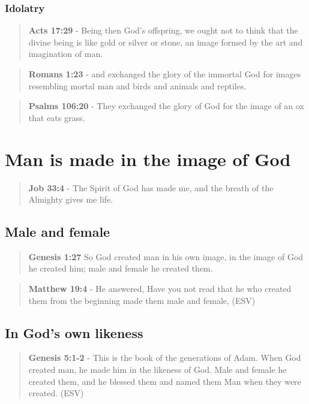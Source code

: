 \documentclass[11pt]{article}
\begin{document}
\subsubsection{Idolatry}
\label{sec:org038acb3}

\begin{quote}
\textbf{Acts 17:29} - Being then God's offspring, we ought not to think that the divine being is like gold or silver or stone, an image formed by the art and imagination of man.
\end{quote}

\begin{quote}
\textbf{Romans 1:23} - and exchanged the glory of the immortal God for images resembling mortal man and birds and animals and reptiles.􄐺
\end{quote}

\begin{quote}
\textbf{Psalms 106:20} - They exchanged the glory of God for the image of an ox that eats grass.􂉢
\end{quote}

\section{Man is made in the image of God}
\label{sec:org3102bcc}
\begin{quote}
\textbf{Job 33:4} - The Spirit of God has made me, and the breath of the Almighty gives me life.
\end{quote}

\subsection{Male and female}
\label{sec:org703a29a}
\begin{quote}
\textbf{Genesis 1:27} So God created man in his own image, in the image of God he created him; male and female he created them.
\end{quote}

\begin{quote}
\textbf{Matthew 19:4} - He answered, Have you not read that he who created them from the beginning made them male and female, (ESV)
\end{quote}

\subsection{In God's own likeness}
\label{sec:org78dd30a}
\begin{quote}
\textbf{Genesis 5:1-2} -  This is the book of the generations of Adam.  When God created man, he made him in the likeness of God.  Male and female he created them, and he blessed them and named them Man when they were created.  (ESV)
\end{quote}
\end{document}
